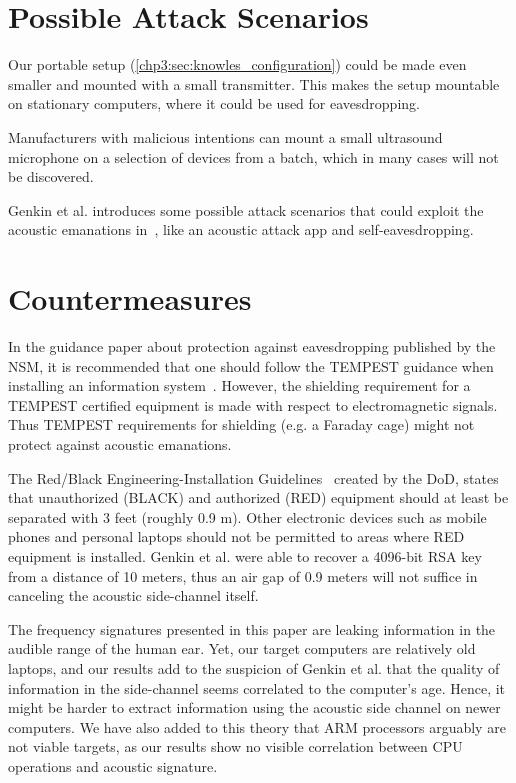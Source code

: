 \section{Possible Attack Scenarios}\label{chp6:sec:attack_scenarios}

Our portable setup (\autoref{chp3:sec:knowles_configuration}) could be made even smaller and mounted with a small transmitter. 
This makes the setup mountable on stationary computers, where it could be used for eavesdropping. 

Manufacturers with malicious intentions can mount a small ultrasound microphone on a selection of devices from a batch, which in many cases will not be discovered.

Genkin et al. introduces some possible attack scenarios that could exploit the acoustic emanations in~\cite[Section 1.2 and Appendix B]{DBLP:journals/iacr/GenkinST13}, like an acoustic attack app and self-eavesdropping.

\section{Countermeasures}\label{chp6:sec:countermeasures}

In the guidance paper about protection against eavesdropping published by the \gls{NSM}, it is recommended that one should follow the TEMPEST guidance when installing an information system~\cite[Section 9.8, page 7]{url:NSM/avlytting}.
However, the shielding requirement for a TEMPEST certified equipment is made with respect to electromagnetic signals.
Thus TEMPEST requirements for shielding (e.g. a Faraday cage) might not protect against acoustic emanations. 

The Red/Black Engineering-Installation Guidelines~\cite[Section 30.1, page 91]{url:Red/Black/Engineering} created by the \gls{DoD}, states that unauthorized (BLACK) and authorized (RED) equipment should at least be separated with 3 feet (roughly 0.9 m).
Other electronic devices such as mobile phones and personal laptops should not be permitted to areas where RED equipment is installed. 
Genkin et al. were able to recover a 4096-bit RSA key from a distance of 10 meters, thus an air gap of 0.9 meters will not suffice in canceling the acoustic side-channel itself.

The frequency signatures presented in this paper are leaking information in the audible range of the human ear.
Yet, our target computers are relatively old laptops, and our results add to the suspicion of Genkin et al. that the quality of information in the side-channel seems correlated to the computer's age.
Hence, it might be harder to extract information using the acoustic side channel on newer computers.
We have also added to this theory that ARM processors arguably are not viable targets, as our results show no visible correlation between CPU operations and acoustic signature.
